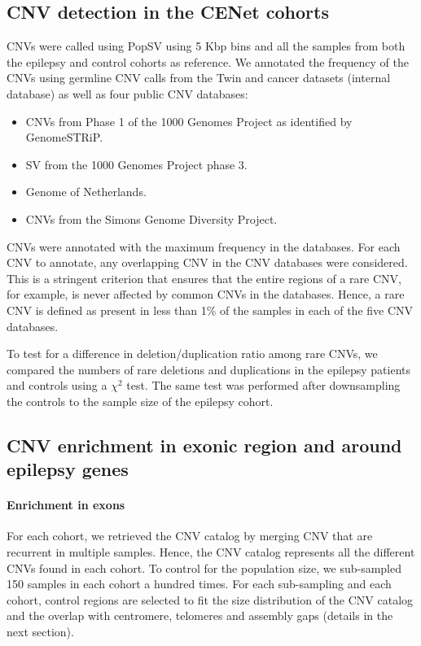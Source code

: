 \subsection*{CNV detection in the CENet cohorts}
CNVs were called using {\sf PopSV} using 5 Kbp bins and all the samples from both the epilepsy and control cohorts as reference.
We annotated the frequency of the CNVs using germline CNV calls from the Twin and cancer datasets (internal database) as well as four public CNV databases:

\begin{itemize}
\item CNVs from Phase 1 of the 1000 Genomes Project as identified by {\sf GenomeSTRiP}\citep{Handsaker2015}.
\item SV from the 1000 Genomes Project phase 3\citep{Sudmant2015a}.
\item Genome of Netherlands\citep{Francioli2014}.
\item CNVs from the Simons Genome Diversity Project\citep{Sudmant2015}.
\end{itemize}

CNVs were annotated with the maximum frequency in the databases.
For each CNV to annotate, any overlapping CNV in the CNV databases were considered.
This is a stringent criterion that ensures that the entire regions of a rare CNV, for example, is never affected by common CNVs in the databases. 
Hence, a rare CNV is defined as present in less than 1\% of the samples in each of the five CNV databases.

To test for a difference in deletion/duplication ratio among rare CNVs, we compared the numbers of rare deletions and duplications in the epilepsy patients and controls using a $\chi^2$ test.
The same test was performed after downsampling the controls to the sample size of the epilepsy cohort.

\subsection*{CNV enrichment in exonic region and around epilepsy genes}

\paragraph{Enrichment in exons}
For each cohort, we retrieved the CNV catalog by merging CNV that are recurrent in multiple samples.
Hence, the CNV catalog represents all the different CNVs found in each cohort.
To control for the population size, we sub-sampled 150 samples in each cohort a hundred times.
For each sub-sampling and each cohort, control regions are selected to fit the size distribution of the CNV catalog and the overlap with centromere, telomeres and assembly gaps (details in the next section).

